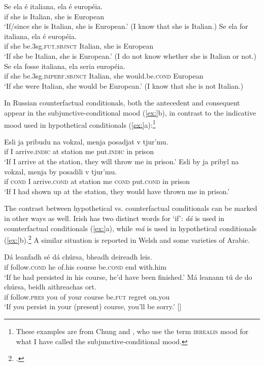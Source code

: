 \ea
\ea \gll Se  ela  é  italiana,  ela  é  européia.\\
if  she  is  Italian,  she  is  European\\
\glt ‘If/since she is Italian, she is European.’ (I know that she is Italian.)
\ex \gll Se  ela  for  italiana,  ela  é  européia.\\
if  she  be.3sg.\textsc{fut.sbjnct}  Italian,  she  is  European\\
\glt ‘If she be Italian, she is European.’ (I do not know whether she is Italian or not.)
\ex \gll  Se  ela  fosse  italiana,  ela  seria  européia.\\
if  she  be.3sg.\textsc{imperf.sbjnct}  Italian,  she  would.be.\textsc{cond}  European\\
\glt ‘If she were Italian, she would be European.’ (I know that she is not Italian.)
\z \z


In Russian counterfactual conditionals, both the antecedent and consequent appear in the subjunctive-conditional mood (\ref{ex:}b), in contrast to the indicative mood used in hypothetical conditionals (\ref{ex:}a):\footnote{These examples are from Chung and \citet[251]{Timberlake1985}, who use the term \textsc{irrealis} mood for what I have called the subjunctive-conditional mood.}


\ea
\ea \gll Esli  ja  pribudu  na  vokzal,  menja  posadjat  v  tjur’mu.\\
if  I  arrive.\textsc{indic}  at  station  me  put.\textsc{indic}  in  prison\\
\glt ‘If I arrive at the station, they will throw me in prison.’ 
\ex \gll Esli  by  ja  pribyl  na  vokzal,  menja  by  posadili  v  tjur’mu.\\
if  \textsc{cond}  I  arrive.\textsc{cond}  at  station  me  \textsc{cond}  put.\textsc{cond}  in  prison\\
\glt ‘If I had shown up at the station, they would have thrown me in prison.’
\z \z


The contrast between hypothetical vs. counterfactual conditionals can be marked in other ways as well. Irish has two distinct words for ‘if’: \textit{dá} is used in counterfactual conditionals (\ref{ex:}a), while \textit{má} is used in hypothetical conditionals (\ref{ex:}b).\footnote{\citet{McCloskey2001}.} A similar situation is reported in Welsh and some varieties of Arabic.


\ea
\ea  \gll Dá  leanfadh  sé  dá  chúrsa,  bheadh  deireadh  leis.\\
if  follow.\textsc{cond}  he  of.his  course  be.\textsc{cond}  end  with.him\\
\glt ‘If he had persisted in his course, he’d have been finished.’
\ex \gll  Má  leanann  tú  de  do  chúrsa,  beidh  aithreachas  ort.\\
if  follow.\textsc{pres}  you  of  your  course  be.\textsc{fut}  regret  on.you\\
\glt ‘If you persist in your (present) course, you’ll be sorry.’  [\citealt{McCloskey2001}]
\z \z


